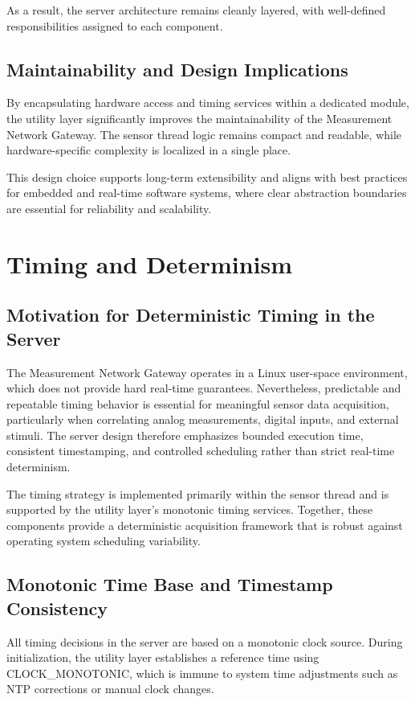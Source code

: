 As a result, the server architecture remains cleanly layered, with well-defined responsibilities assigned to each component.

\subsection{Maintainability and Design Implications}
By encapsulating hardware access and timing services within a dedicated module, the utility layer significantly improves the maintainability of the Measurement Network Gateway. The sensor thread logic remains compact and readable, while hardware-specific complexity is localized in a single place.

This design choice supports long-term extensibility and aligns with best practices for embedded and real-time software systems, where clear abstraction boundaries are essential for reliability and scalability.


\section{Timing and Determinism}
\subsection{Motivation for Deterministic Timing in the Server}
The Measurement Network Gateway operates in a Linux user-space environment, which does not provide hard real-time guarantees. Nevertheless, predictable and repeatable timing behavior is essential for meaningful sensor data acquisition, particularly when correlating analog measurements, digital inputs, and external stimuli. The server design therefore emphasizes bounded execution time, consistent timestamping, and controlled scheduling rather than strict real-time determinism.

The timing strategy is implemented primarily within the sensor thread and is supported by the utility layer’s monotonic timing services. Together, these components provide a deterministic acquisition framework that is robust against operating system scheduling variability.

\subsection{Monotonic Time Base and Timestamp Consistency}
All timing decisions in the server are based on a monotonic clock source. During initialization, the utility layer establishes a reference time using CLOCK\_MONOTONIC, which is immune to system time adjustments such as NTP corrections or manual clock changes.

